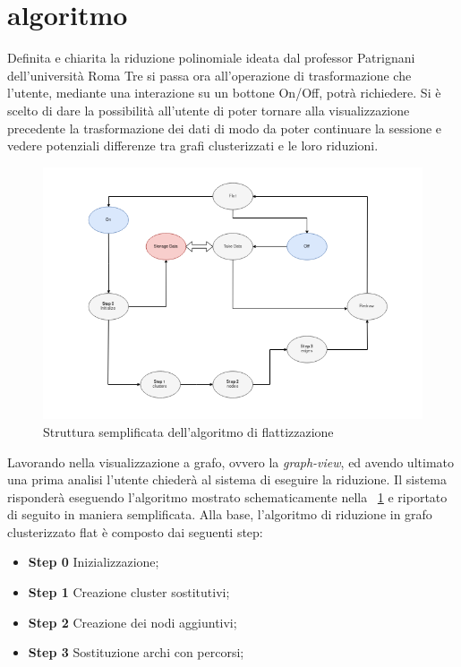 {\section{algoritmo}
Definita e chiarita la riduzione polinomiale ideata dal professor Patrignani dell'università Roma Tre si passa ora all'operazione di trasformazione che l'utente, mediante una interazione su un bottone On/Off, potrà richiedere. Si è scelto di dare la possibilità all'utente di poter tornare alla visualizzazione precedente la trasformazione dei dati di modo da poter continuare la sessione e vedere potenziali differenze tra grafi clusterizzati e le loro riduzioni.
\begin{figure}[!htb]
	\begin{center}
		\includegraphics[width=1.1 \linewidth]{figure/flatAlg}
	\end{center}
	\caption{Struttura semplificata dell'algoritmo di flattizzazione \label{fig:flatAlg}}
\end{figure}
Lavorando nella visualizzazione a grafo, ovvero la \textit{graph-view}, ed avendo ultimato una prima analisi l'utente chiederà al sistema di eseguire la riduzione. Il sistema risponderà eseguendo l'algoritmo mostrato schematicamente nella \figurename~\ref{fig:flatAlg} e riportato di seguito in maniera semplificata. Alla base, l'algoritmo di riduzione in grafo clusterizzato flat è composto dai seguenti step:
\begin{itemize}
	\item \textbf{Step 0} Inizializzazione;
	\item \textbf{Step 1} Creazione cluster sostitutivi;
	\item \textbf{Step 2} Creazione dei nodi aggiuntivi;
	\item \textbf{Step 3} Sostituzione archi con percorsi;

\end{itemize}}
